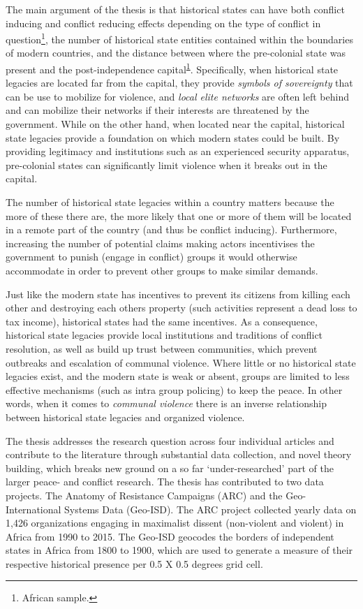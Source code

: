 The main argument of the thesis is that historical states can have both conflict
inducing and conflict reducing effects depending on the type of conflict in
question\footnote{\label{note1}African sample.}, the number of historical state
entities contained within the boundaries of modern countries, and the distance
between where the pre-colonial state was present and the post-independence
capital\textsuperscript{\ref{note1}}. Specifically, when historical state
legacies are located far from the capital, they provide \textit{symbols of
sovereignty} that can be use to mobilize for violence, and \textit{local elite
networks} are often left behind and can mobilize their networks if their
interests are threatened by the government. While on the other hand, when
located near the capital, historical state legacies provide a foundation on
which modern states could be built. By providing legitimacy and institutions
such as an experienced security apparatus, pre-colonial states can significantly
limit violence when it breaks out in the capital.

The number of historical state legacies within a country matters because the
more of these there are, the more likely that one or more of them will be
located in a remote part of the country (and thus be conflict inducing).
Furthermore, increasing the number of potential claims making actors
incentivises the government to punish (engage in conflict) groups it would
otherwise accommodate in order to prevent other groups to make similar demands.

Just like the modern state has incentives to prevent its citizens from killing
each other and destroying each others property (such activities represent a dead
loss to tax income), historical states had the same incentives. As a
consequence, historical state legacies provide local institutions and traditions
of conflict resolution, as well as build up trust between communities, which
prevent outbreaks and escalation of communal violence. Where little or no
historical state legacies exist, and the modern state is weak or absent, groups
are limited to less effective mechanisms (such as intra group policing) to keep
the peace. In other words, when it comes to \textit{communal violence} there is
an inverse relationship between historical state legacies and organized
violence.

The thesis addresses the research question across four individual articles and
contribute to the literature through substantial data collection, and novel
theory building, which breaks new ground on a so far `under-researched' part of
the larger peace- and conflict research. The thesis has contributed to two data
projects. The Anatomy of Resistance Campaigns (ARC) and the Geo-International
Systems Data (Geo-ISD). The ARC project collected yearly data on 1,426 organizations
engaging in maximalist dissent (non-violent and violent) in Africa from 1990 to
2015. The Geo-ISD geocodes the borders of independent states in Africa from
1800 to 1900, which are used to generate a measure of their respective
historical presence per 0.5 X 0.5 degrees grid cell. 

